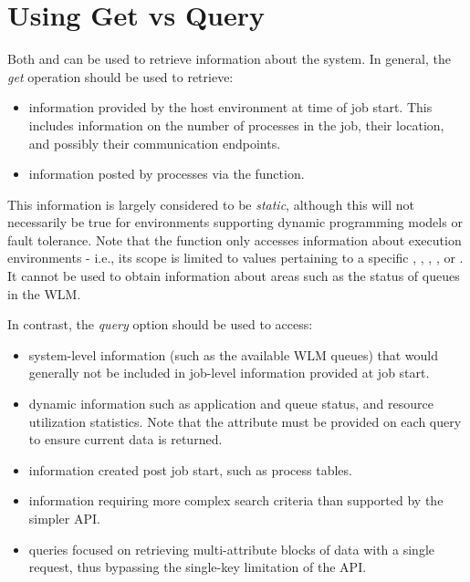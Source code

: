 
\begin{arglist}
\end{arglist}


\section{Using Get vs Query}
\label{chap:api_job_mgmt:query}

Both  and  can be used to retrieve information about the system. In general, the \emph{get} operation should be used to retrieve:

\begin{itemize}
\item information provided by the host environment at time of job start. This includes information on the number of processes in the job, their location, and possibly their communication endpoints.
\item information posted by processes via the  function.
\end{itemize}

This information is largely considered to be \emph{static}, although this will not necessarily be true for environments supporting dynamic programming models or fault tolerance. Note that the  function only accesses information about execution environments - i.e., its scope is limited to values pertaining to a specific , , , , or . It cannot be used to obtain information about areas such as the status of queues in the \ac{WLM}.

In contrast, the \emph{query} option should be used to access:

\begin{itemize}
\item system-level information (such as the available \ac{WLM} queues) that would generally not be included in job-level information provided at job start.
\item dynamic information such as application and queue status, and resource utilization statistics. Note that the  attribute must be provided on each query to ensure current data is returned.
\item information created post job start, such as process tables.
\item information requiring more complex search criteria than supported by the simpler  \ac{API}.
\item queries focused on retrieving multi-attribute blocks of data with a single request, thus bypassing the single-key limitation of the  \ac{API}.
\end{itemize}

